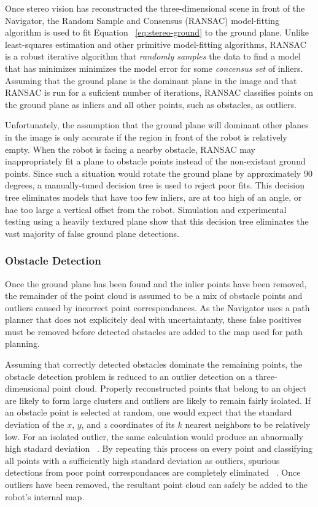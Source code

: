 \documentclass[twocolumn,11pt]{article}
\begin{document}
Once stereo vision has reconstructed the three-dimensional scene in front of the
Navigator, the Random Sample and Consensus (RANSAC) model-fitting algorithm is
used to fit Equation ~\ref{eq:stereo-ground} to the ground plane. Unlike least-squares estimation and other primitive
model-fitting algorithms, RANSAC is a robust iterative algorithm that
\textit{randomly samples} the data to find a model that has minimizes minimizes
the model error for some \textit{concensus set} of inliers. Assuming that the
ground plane is the dominant plane in the image and that RANSAC is run for a
suficient number of iterations, RANSAC classifies points on the ground plane as
inliers and all other points, such as obstacles, as outliers.

Unfortunately, the assumption that the ground plane will dominant other planes
in the image is only accurate if the region in front of the robot is relatively
empty. When the robot is facing a nearby obstacle, RANSAC may inappropriately
fit a plane to obstacle points instead of the non-existant ground points. Since
such a situation would rotate the ground plane by approximately 90 degrees, a
manually-tuned decision tree is used to reject poor fits. This decision tree
eliminates models that have too few inliers, are at too high of an angle, or
hae too large a vertical offset from the robot. Simulation and experimental
testing using a heavily textured plane show that this decision tree eliminates
the vast majority of false ground plane detections.

\subsubsection{Obstacle Detection}
\label{sec:stereo-od}
Once the ground plane has been found and the inlier points have been removed,
the remainder of the point cloud is assumed to be a mix of obstacle points
and outliers caused by incorrect point correspondances. As the Navigator uses
a path planner that does not explicitely deal with uncertaintanty, these false
positives must be removed before detected obstacles are added to the map used
for path planning.

Assuming that correctly detected obstacles dominate the remaining points, the
obstacle detection problem is reduced to an outlier detection on a
three-dimensional point cloud. Properly reconstructed points that belong to an
object are likely to form large clusters and outliers are likely to remain
fairly isolated. If an obstacle point is selected at random, one would expect
that the standard deviation of the $x$, $y$, and $z$ coordinates of its $k$
nearest neighbors to be relatively low. For an isolated outlier, the same
calculation would produce an abnormally high stadard deviation
~\cite{rusu2008towards}. By repeating this process on every point and
classifying all points with a sufficiently high standard deviation as outliers,
spurious detections from poor point correspondances are completely eliminated
~\cite{rusu2008towards}. Once outliers have been removed, the resultant point
cloud can safely be added to the robot's internal map.
\end{document}
